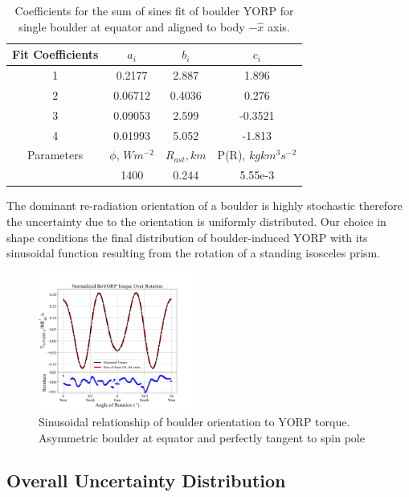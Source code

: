 \begin{table}[H]
    \centering
    \begin{tabular}{|c|c|c|c|}
        \hline
        Fit Coefficients &$a_i$ & $b_i$ & $c_i$ \\
        \hline
        1 & 0.2177 & 2.887 & 1.896 \\
        2 & 0.06712 & 0.4036 & 0.276 \\
        3 & 0.09053 & 2.599 & -0.3521 \\
        4 & 0.01993 & 5.052 & -1.813 \\
        \hline
        Parameters & $\phi$,  $W m^{-2}$ & $R_{ast}, km$  & P(R), $kg km^3 s^{-2}$ \\
        \hline
         & 1400& 0.244 & 5.55e-3  \\
         \hline
    \end{tabular}
    \caption{Coefficients for the sum of sines fit of boulder YORP for single boulder at equator and aligned to body $-\hat{x}$ axis.}
    \label{coeffs}
\end{table}
The dominant re-radiation orientation of a boulder is highly stochastic therefore the uncertainty due to the orientation is uniformly distributed. Our choice in shape conditions the final distribution of boulder-induced YORP with its sinusoidal function resulting from the rotation of a standing isosceles prism. 

\begin{figure}[H]
    \centering
    \includegraphics[width=0.45\textwidth]{fig/rotation_plot_one_equator_boulder.png}
    \caption{Sinusoidal relationship of boulder orientation to YORP torque. Asymmetric boulder at equator and perfectly tangent to spin pole}
    \label{fig:sine}
\end{figure}


\subsection{Overall Uncertainty Distribution}

